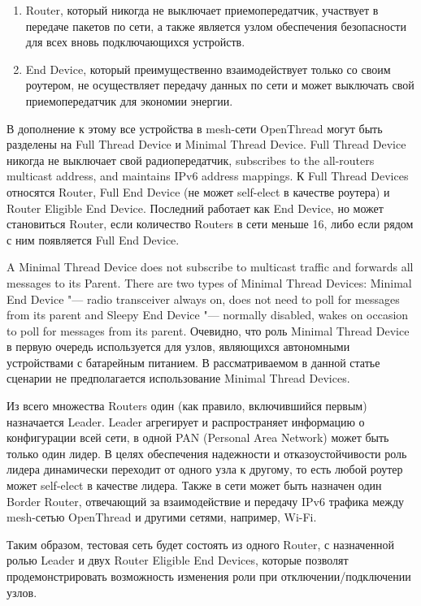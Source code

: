 \begin{enumerate}
	\item Router, который никогда не выключает приемопередатчик, участвует в передаче пакетов по сети, а также является узлом обеспечения безопасности для всех вновь подключающихся устройств.
	\item End Device, который преимущественно взаимодействует только со своим роутером, не осуществляет передачу данных по сети и может выключать свой приемопередатчик для экономии энергии.
\end{enumerate}

В дополнение к этому все устройства в mesh-сети OpenThread могут быть разделены на Full Thread Device и Minimal Thread Device. Full Thread Device никогда не выключает свой радиопередатчик, subscribes to the all-routers multicast address, and maintains IPv6 address mappings. К Full Thread Devices относятся Router, Full End Device (не может self-elect в качестве роутера) и Router Eligible End Device. Последний работает как End Device, но может становиться Router, если количество Routers в сети меньше 16, либо если рядом с ним появляется Full End Device.

A Minimal Thread Device does not subscribe to multicast traffic and forwards all messages to its Parent. There are two types of Minimal Thread Devices: Minimal End Device "--- radio transceiver always on, does not need to poll for messages from its parent and Sleepy End Device "--- normally disabled, wakes on occasion to poll for messages from its parent. Очевидно, что роль Minimal Thread Device в первую очередь используется для узлов, являющихся автономными устройствами с батарейным питанием. В рассматриваемом в данной статье сценарии не предполагается использование Minimal Thread Devices. 

Из всего множества Routers один (как правило, включившийся первым) назначается Leader. Leader агрегирует и распространяет информацию о конфигурации всей сети, в одной PAN (Personal Area Network) может быть только один лидер.  В целях обеспечения надежности и отказоустойчивости роль лидера динамически переходит от одного узла к другому, то есть любой роутер может self-elect в качестве лидера. Также в сети может быть назначен один Border Router, отвечающий за взаимодействие и передачу IPv6 трафика между mesh-сетью OpenThread и другими сетями, например, Wi-Fi.

Таким образом, тестовая сеть будет состоять из одного Router, с назначенной ролью Leader и двух Router Eligible End Devices, которые позволят продемонстрировать возможность изменения роли при отключении/подключении узлов.

